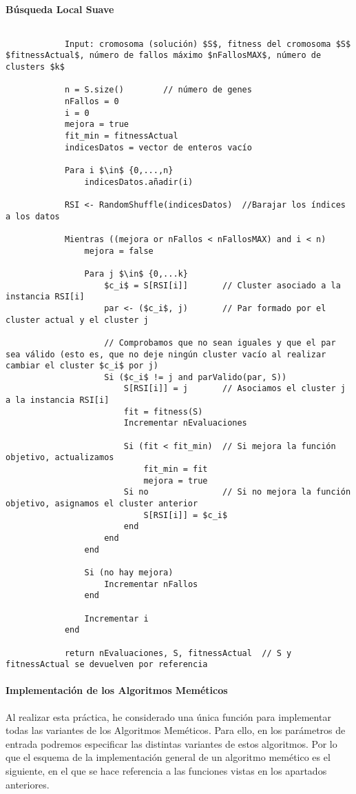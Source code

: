 		\paragraph{Búsqueda Local Suave}
		$ $\\
		\footnotesize 
		\begin{lstlisting}
			Input: cromosoma (solución) $S$, fitness del cromosoma $S$ $fitnessActual$, número de fallos máximo $nFallosMAX$, número de clusters $k$

			n = S.size() 		// número de genes
			nFallos = 0
			i = 0
			mejora = true 
			fit_min = fitnessActual
			indicesDatos = vector de enteros vacío

			Para i $\in$ {0,...,n}
				indicesDatos.añadir(i)
			
			RSI <- RandomShuffle(indicesDatos)	//Barajar los índices a los datos

			Mientras ((mejora or nFallos < nFallosMAX) and i < n)
				mejora = false

				Para j $\in$ {0,...k}
					$c_i$ = S[RSI[i]] 		// Cluster asociado a la instancia RSI[i]
					par <- ($c_i$, j) 		// Par formado por el cluster actual y el cluster j

					// Comprobamos que no sean iguales y que el par sea válido (esto es, que no deje ningún cluster vacío al realizar cambiar el cluster $c_i$ por j)
					Si ($c_i$ != j and parValido(par, S)) 
						S[RSI[i]] = j		// Asociamos el cluster j a la instancia RSI[i]
						fit = fitness(S)
						Incrementar nEvaluaciones

						Si (fit < fit_min)	// Si mejora la función objetivo, actualizamos
							fit_min = fit 
							mejora = true 
						Si no				// Si no mejora la función objetivo, asignamos el cluster anterior 
							S[RSI[i]] = $c_i$
						end 
					end 
				end 

				Si (no hay mejora)
					Incrementar nFallos 
				end 

				Incrementar i
			end

			return nEvaluaciones, S, fitnessActual	// S y fitnessActual se devuelven por referencia
		\end{lstlisting}
		\normalsize

		\paragraph{Implementación de los Algoritmos Meméticos}
		$ $\\
		Al realizar esta práctica, he considerado una única función para implementar todas las variantes de los Algoritmos Meméticos.
		Para ello, en los parámetros de entrada podremos especificar las distintas variantes de estos algoritmos.
		Por lo que el esquema de la implementación general de un algoritmo memético es el siguiente, en el que se hace referencia a las funciones vistas en los apartados anteriores.
		
